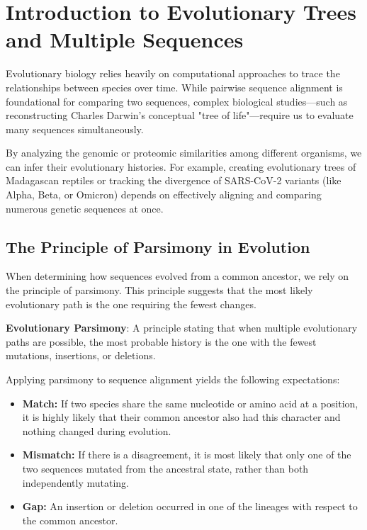 \documentclass[11pt, a4paper]{article}
\newenvironment{important}
  {\begin{tcolorbox}[colback=blue!5!white, colframe=blue!75!black, arc=1mm, boxrule=1pt]}
  {\end{tcolorbox}}
\begin{document}

\section{Introduction to Evolutionary Trees and Multiple Sequences}

Evolutionary biology relies heavily on computational approaches to trace the relationships between species over time. While pairwise sequence alignment is foundational for comparing two sequences, complex biological studies—such as reconstructing Charles Darwin's conceptual "tree of life"—require us to evaluate many sequences simultaneously. 

By analyzing the genomic or proteomic similarities among different organisms, we can infer their evolutionary histories. For example, creating evolutionary trees of Madagascan reptiles or tracking the divergence of SARS-CoV-2 variants (like Alpha, Beta, or Omicron) depends on effectively aligning and comparing numerous genetic sequences at once.


\subsection{The Principle of Parsimony in Evolution}

When determining how sequences evolved from a common ancestor, we rely on the principle of parsimony. This principle suggests that the most likely evolutionary path is the one requiring the fewest changes. 

\begin{important}
  \textbf{Evolutionary Parsimony}: A principle stating that when multiple evolutionary paths are possible, the most probable history is the one with the fewest mutations, insertions, or deletions.
\end{important}

Applying parsimony to sequence alignment yields the following expectations:
\begin{itemize}
    \item \textbf{Match:} If two species share the same nucleotide or amino acid at a position, it is highly likely that their common ancestor also had this character and nothing changed during evolution.
    \item \textbf{Mismatch:} If there is a disagreement, it is most likely that only one of the two sequences mutated from the ancestral state, rather than both independently mutating.
    \item \textbf{Gap:} An insertion or deletion occurred in one of the lineages with respect to the common ancestor.
\end{itemize}
\end{document}
